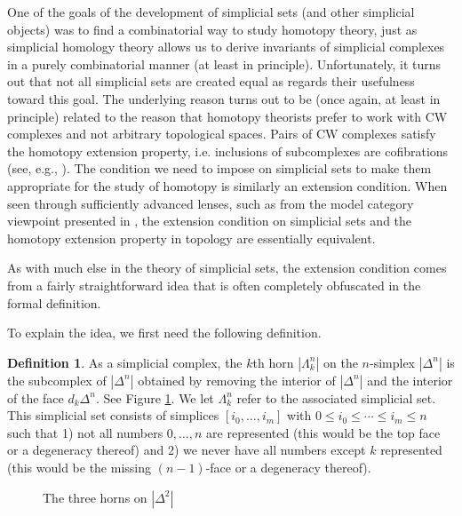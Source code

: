 \documentclass[12pt]{article}
\theoremstyle{plain}
\theoremstyle{definition}
\newtheorem{definition}[theorem]{Definition}
\begin{document}
One of the goals of the development of simplicial sets (and other simplicial objects) was to find a  combinatorial way to study homotopy theory, just as simplicial homology theory allows us to derive invariants of simplicial complexes in a purely combinatorial manner (at least in principle).
Unfortunately, it turns out that not all simplicial sets are created equal as regards their usefulness toward this goal. The underlying reason turns out to be (once again, at least in principle) related to the reason that homotopy theorists prefer to work with CW complexes and not arbitrary topological spaces. Pairs of CW complexes satisfy the homotopy extension property, i.e. inclusions of subcomplexes are cofibrations (see, e.g., \cite{DK}). The condition we need to impose on simplicial sets to make them appropriate for the study of homotopy is similarly an extension condition. When seen through sufficiently advanced lenses, such as from the model category viewpoint presented in  \cite{GoeJar}, the extension condition on simplicial sets and the homotopy extension property in topology are essentially equivalent. 

As with much else in the theory of simplicial sets, the extension condition comes from a fairly straightforward idea that is often completely obfuscated in the formal definition. 

To explain the idea, we first need the following definition. 

\begin{definition}
As a simplicial complex, the $k$th horn $|\Lambda^n_k|$ on the $n$-simplex $|\Delta^n|$ is the subcomplex of $|\Delta^n|$ obtained by removing the interior of $|\Delta^n|$ and the interior of the face $d_k\Delta^n$. See Figure \ref{F: fig18}. We let $\Lambda^n_k$ refer to the associated simplicial set. This simplicial set consists of simplices $[i_0,\ldots,i_m]$ with $0\leq i_0\leq \cdots\leq i_m\leq n$ such that 1) not all numbers $0,\ldots, n$ are represented (this would be the top face or a degeneracy thereof) and 2) we never have all numbers except $k$ represented (this would be the missing $(n-1)$-face or a degeneracy thereof).  
\end{definition}


\begin{figure}[!htp]
\begin{center}
\end{center}
\caption{The three horns on $|\Delta^2|$}\label{F: fig18}
\end{figure}
\end{document}
